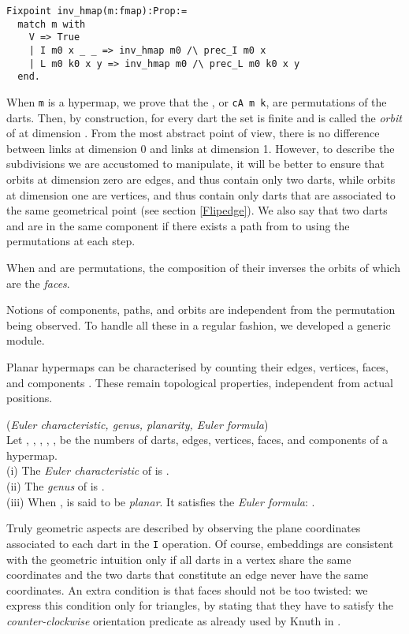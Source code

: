 \documentclass{llncs}
\begin{document}
\begin{verbatim}
Fixpoint inv_hmap(m:fmap):Prop:=
  match m with
    V => True
    | I m0 x _ _ => inv_hmap m0 /\ prec_I m0 x
    | L m0 k0 x y => inv_hmap m0 /\ prec_L m0 k0 x y
  end.
\end{verbatim}

When {\tt m} is a hypermap, we prove that the , or {\tt cA m k}, are permutations of the darts. Then, by construction, for every dart  the set  is finite and is called the {\em orbit} of 
at dimension . From the most abstract point of view, there is no difference between links at dimension 0 and links at dimension 1. However, to describe the subdivisions we are accustomed to manipulate, it will be better to ensure that orbits at dimension zero are edges, and thus contain only
two darts, while orbits at dimension one are vertices, and thus contain
only darts that are associated to the same geometrical point (see section \ref{Flipedge}).  We also
say that two darts  and  are in the same component if there
exists a path from  to  using the  permutations at
each step.

When  and  are permutations, the composition of
their inverses  the orbits of
which are the {\em faces}.

Notions of components, paths, and orbits are independent from the
permutation being observed.  To handle all these in a regular fashion,
we developed a generic module.

Planar hypermaps can be characterised by counting their edges,
vertices, faces, and components \cite{duf08a}.  These remain topological
properties, independent from actual positions.

\begin{definition}({\em Euler characteristic, genus, planarity, Euler formula})\\
Let , , , , , be the numbers of darts, edges, vertices, faces, and components of a hypermap.\\
(i) The {\em Euler characteristic} of  is .\\
(ii) The {\em genus} of  is .\\
(iii) When ,  is said to be {\em planar}. 
It satisfies the {\em Euler formula}: .
\end{definition}

Truly geometric aspects are described by observing the plane coordinates
associated to each dart in the {\tt I} operation.  Of course, embeddings are
consistent with the geometric intuition only if all darts in a vertex share
the same coordinates and the two darts that constitute an edge never have the
same coordinates.  An extra condition is that faces should not be too
twisted: we express this condition only for triangles, by stating that they
have to satisfy the {\em counter-clockwise} orientation predicate as already
used by Knuth in \cite{knu}.  
\end{document}
